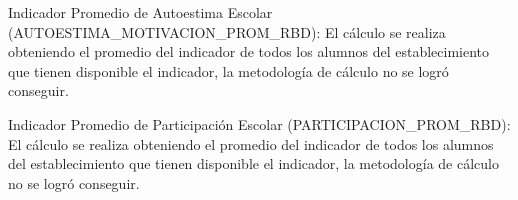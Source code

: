 \begin{longdescription}
\begin{longdescription}
        \item[Indicador Promedio de Autoestima Escolar](AUTOESTIMA\_MOTIVACION\_PROM\_RBD): El cálculo se realiza obteniendo el promedio del indicador de todos los alumnos del establecimiento que tienen disponible el indicador, la metodología de cálculo no se logró conseguir.
        \item[Indicador Promedio de Participación Escolar](PARTICIPACION\_PROM\_RBD): El cálculo se realiza obteniendo el promedio del indicador de todos los alumnos del establecimiento que tienen disponible el indicador, la metodología de cálculo no se logró conseguir.
       \end{longdescription}
\end{longdescription}
